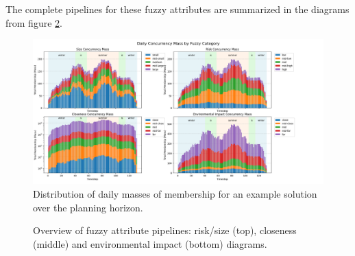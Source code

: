 The complete pipelines for these fuzzy attributes are summarized in the diagrams from figure \ref{fig:risk-size_closeness_envimpact}.



\clearpage                 %
\begin{figure}[!p]
    \begin{adjustwidth}{-1.2cm}{-1.8cm}
    \includegraphics[width=1.07\linewidth]{ch3/figures/Fuzzy_att_concurrency.png}
    \end{adjustwidth}
    \caption{Distribution of daily masses of membership for an example solution over the planning horizon.}
    \label{fig:fuzzy_att_concurrency}
\end{figure}
\begin{figure}[!p]
    \centering                          %
    \begin{adjustwidth}{-1.6cm}{-1.6cm}
  
  
      \vspace{1.5ex}
  
  
      \vspace{1.5ex}
  
  
    \end{adjustwidth}
  
    \caption{Overview of fuzzy attribute pipelines: risk/size (top), closeness (middle) and environmental
             impact (bottom) diagrams.}
    \label{fig:risk-size_closeness_envimpact}
  \end{figure}

\thispagestyle{empty}
  \restoregeometry          %
\clearpage   